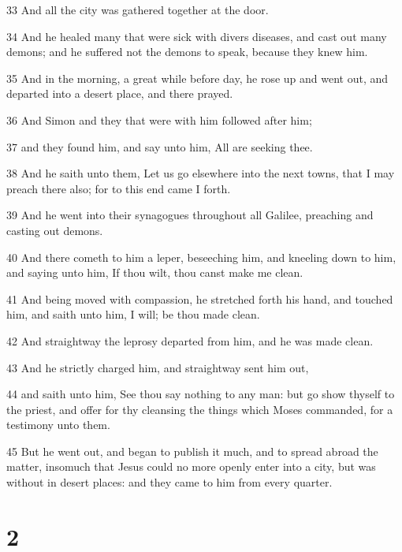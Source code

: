\par 33 And all the city was gathered together at the door.
\par 34 And he healed many that were sick with divers diseases, and cast out many demons; and he suffered not the demons to speak, because they knew him.
\par 35 And in the morning, a great while before day, he rose up and went out, and departed into a desert place, and there prayed.
\par 36 And Simon and they that were with him followed after him;
\par 37 and they found him, and say unto him, All are seeking thee.
\par 38 And he saith unto them, Let us go elsewhere into the next towns, that I may preach there also; for to this end came I forth.
\par 39 And he went into their synagogues throughout all Galilee, preaching and casting out demons.
\par 40 And there cometh to him a leper, beseeching him, and kneeling down to him, and saying unto him, If thou wilt, thou canst make me clean.
\par 41 And being moved with compassion, he stretched forth his hand, and touched him, and saith unto him, I will; be thou made clean.
\par 42 And straightway the leprosy departed from him, and he was made clean.
\par 43 And he strictly charged him, and straightway sent him out,
\par 44 and saith unto him, See thou say nothing to any man: but go show thyself to the priest, and offer for thy cleansing the things which Moses commanded, for a testimony unto them.
\par 45 But he went out, and began to publish it much, and to spread abroad the matter, insomuch that Jesus could no more openly enter into a city, but was without in desert places: and they came to him from every quarter.

\chapter{2}

